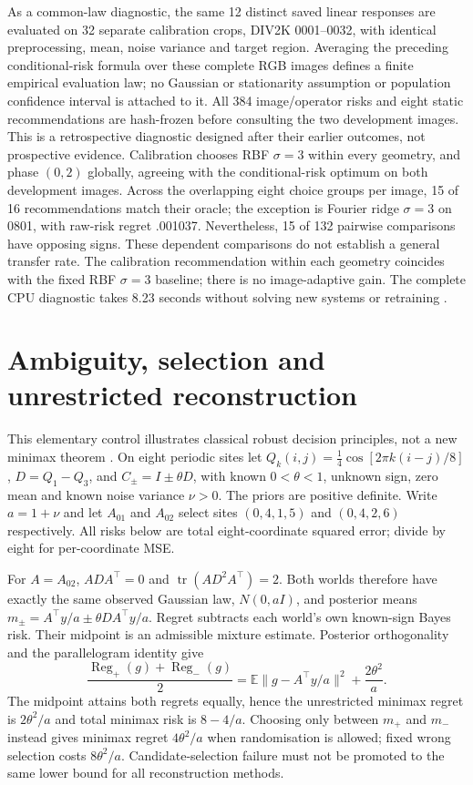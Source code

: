 As a common-law diagnostic, the same 12 distinct saved linear responses
are evaluated on 32 separate calibration crops, DIV2K 0001--0032, with
identical preprocessing, mean, noise variance and target region. Averaging
the preceding conditional-risk formula over these complete RGB images
defines a finite empirical evaluation law; no Gaussian or stationarity
assumption or population confidence interval is attached to it. All 384
image/operator risks and eight static recommendations are hash-frozen
before consulting the two development images. This is a retrospective
diagnostic designed after their earlier outcomes, not prospective evidence.
Calibration chooses RBF $\sigma=3$ within every geometry, and phase $(0,2)$
globally, agreeing with the conditional-risk optimum on both development
images. Across the overlapping eight choice groups per image, 15 of 16
recommendations match their oracle; the exception is Fourier ridge
$\sigma=3$ on 0801, with raw-risk regret .001037. Nevertheless, 15 of 132
pairwise comparisons have opposing signs. These dependent comparisons
do not establish a general transfer rate. The calibration recommendation
within each geometry coincides with the fixed RBF $\sigma=3$ baseline;
there is no image-adaptive gain. The complete CPU diagnostic takes 8.23
seconds without solving new systems or retraining .

\section{Ambiguity, selection and unrestricted reconstruction}\label{app:ambiguity}
This elementary control illustrates classical robust decision principles,
not a new minimax theorem \citep{kitagawa2011inference}.
On eight periodic sites let $Q_k(i,j)=\tfrac14\cos[2\pi k(i-j)/8]$,
$D=Q_1-Q_3$, and $C_\pm=I\pm\theta D$, with known $0<\theta<1$,
unknown sign, zero mean and known noise variance $\nu>0$.
The priors are positive definite. Write $a=1+\nu$ and let $A_{01}$ and
$A_{02}$ select sites $(0,4,1,5)$ and $(0,4,2,6)$ respectively.
All risks below are total eight-coordinate squared error; divide by eight
for per-coordinate MSE.

For $A=A_{02}$, $ADA^\top=0$ and $\operatorname{tr}(AD^2A^\top)=2$.
Both worlds therefore have exactly the same observed Gaussian law,
$N(0,aI)$, and posterior means $m_\pm=A^\top y/a\pm\theta DA^\top y/a$.
Regret subtracts each world's own known-sign Bayes risk.
Their midpoint is an admissible mixture estimate. Posterior orthogonality
and the parallelogram identity give
\[
\frac{\operatorname{Reg}_+(g)+\operatorname{Reg}_-(g)}2
=\mathbb E\|g-A^\top y/a\|^2+\frac{2\theta^2}{a}.
\]
The midpoint attains both regrets equally, hence the unrestricted minimax
regret is $2\theta^2/a$ and total minimax risk is $8-4/a$.
Choosing only between $m_+$ and $m_-$ instead gives minimax regret
$4\theta^2/a$ when randomisation is allowed; fixed wrong selection costs
$8\theta^2/a$. Candidate-selection failure must not be promoted to the
same lower bound for all reconstruction methods.

